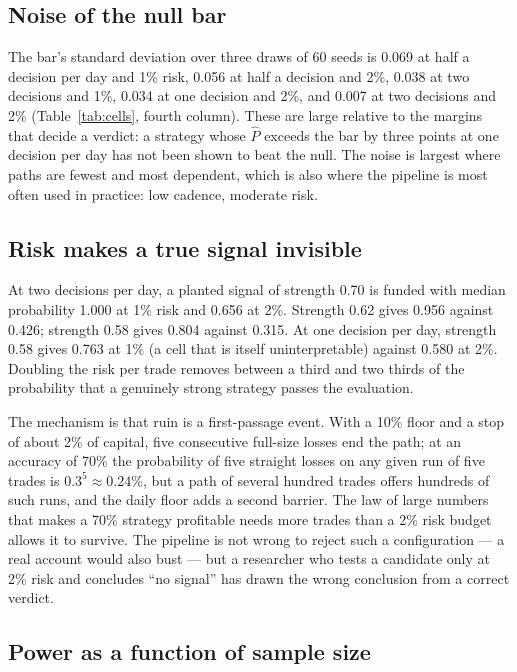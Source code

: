 \documentclass[11pt]{article}
\newcommand{\Pf}{\hat{P}}
\begin{document}
\subsection{Noise of the null bar}
\label{sec:noise}

The bar's standard deviation over three draws of 60 seeds is 0.069 at half a decision per day and 1\% risk, 0.056 at half a decision and 2\%, 0.038 at two decisions and 1\%, 0.034 at one decision and 2\%, and 0.007 at two decisions and 2\% (Table~\ref{tab:cells}, fourth column). These are large relative to the margins that decide a verdict: a strategy whose $\Pf$ exceeds the bar by three points at one decision per day has not been shown to beat the null. The noise is largest where paths are fewest and most dependent, which is also where the pipeline is most often used in practice: low cadence, moderate risk.

\subsection{Risk makes a true signal invisible}
\label{sec:risk}

At two decisions per day, a planted signal of strength 0.70 is funded with median probability 1.000 at 1\% risk and 0.656 at 2\%. Strength 0.62 gives 0.956 against 0.426; strength 0.58 gives 0.804 against 0.315. At one decision per day, strength 0.58 gives 0.763 at 1\% (a cell that is itself uninterpretable) against 0.580 at 2\%. Doubling the risk per trade removes between a third and two thirds of the probability that a genuinely strong strategy passes the evaluation.

The mechanism is that ruin is a first-passage event. With a 10\% floor and a stop of about 2\% of capital, five consecutive full-size losses end the path; at an accuracy of 70\% the probability of five straight losses on any given run of five trades is $0.3^5 \approx 0.24\%$, but a path of several hundred trades offers hundreds of such runs, and the daily floor adds a second barrier. The law of large numbers that makes a 70\% strategy profitable needs more trades than a 2\% risk budget allows it to survive. The pipeline is not wrong to reject such a configuration --- a real account would also bust --- but a researcher who tests a candidate only at 2\% risk and concludes ``no signal'' has drawn the wrong conclusion from a correct verdict.

\subsection{Power as a function of sample size}
\label{sec:n}
\end{document}
